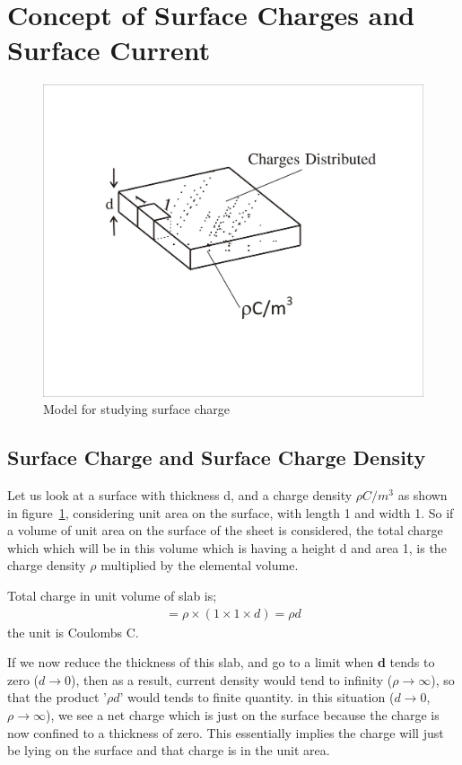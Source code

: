 \section{Concept of Surface Charges and Surface Current}
\begin{figure}[h]
\centering
\includegraphics[width=.7\linewidth]{./graphics/surfacecharge}
\caption{Model for studying surface charge}
\label{fig:surfacecharge}
\end{figure} 

\subsection{Surface Charge and Surface Charge Density}
Let us look at a surface with thickness d, and a charge density $\rho$$C/m^{3}$ as shown in figure~\ref{fig:surfacecharge}, considering  unit area on the surface, with length 1 and width 1. So if a volume of unit area on the surface of the sheet is considered, the total charge which which will be in this volume which is having a height d and area 1, is the charge density $\rho$ multiplied by the elemental volume.

Total charge in unit volume of slab is;
\begin{align*}
=\rho\times(1\times 1\times d)=\rho d
\end{align*}
the unit is Coulombs C.

If we now reduce the thickness of this slab, and go to a limit when \textbf{d} tends to zero ($d\rightarrow 0$), then as a result, current density would tend to infinity ($\rho\rightarrow\infty$), so that the product '$\rho d$' would tends to finite quantity. in this situation ($d\rightarrow 0$, $\rho\rightarrow\infty$), we see a net charge which is just on the surface because the charge is now confined to a thickness of zero. This essentially implies the charge will just be lying on the surface and that charge is in the unit area. 


